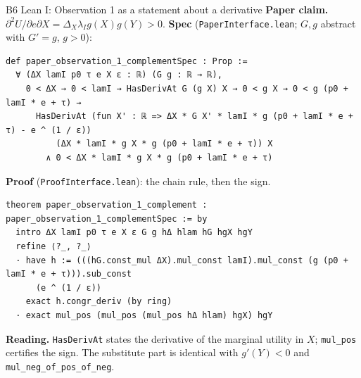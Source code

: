 \documentclass[aspectratio=169,11pt]{beamer}
\begin{document}
\begin{frame}[fragile]{B6 \textperiodcentered{} Lean I: Observation 1 as a statement about a derivative}
  \small\textbf{Paper claim.} $\partial^2U/\partial e\partial X=\Delta_X\lambda_I g(X)g(Y)>0$.
  \textbf{Spec} (\texttt{PaperInterface.lean}; $G,g$ abstract with $G'=g$, $g>0$):
\begin{lstlisting}
def paper_observation_1_complementSpec : Prop :=
  ∀ (ΔX lamI p0 τ e X ε : ℝ) (G g : ℝ → ℝ),
    0 < ΔX → 0 < lamI → HasDerivAt G (g X) X → 0 < g X → 0 < g (p0 + lamI * e + τ) →
      HasDerivAt (fun X' : ℝ => ΔX * G X' * lamI * g (p0 + lamI * e + τ) - e ^ (1 / ε))
          (ΔX * lamI * g X * g (p0 + lamI * e + τ)) X
        ∧ 0 < ΔX * lamI * g X * g (p0 + lamI * e + τ)
\end{lstlisting}
  \textbf{Proof} (\texttt{ProofInterface.lean}): the chain rule, then the sign.
\begin{lstlisting}
theorem paper_observation_1_complement : paper_observation_1_complementSpec := by
  intro ΔX lamI p0 τ e X ε G g hΔ hlam hG hgX hgY
  refine ⟨?_, ?_⟩
  · have h := (((hG.const_mul ΔX).mul_const lamI).mul_const (g (p0 + lamI * e + τ))).sub_const
      (e ^ (1 / ε))
    exact h.congr_deriv (by ring)
  · exact mul_pos (mul_pos (mul_pos hΔ hlam) hgX) hgY
\end{lstlisting}
  \textbf{Reading.} \texttt{HasDerivAt} states the derivative of the marginal utility in $X$; \texttt{mul\_pos} certifies
  the sign. The substitute part is identical with $g'(Y)<0$ and \texttt{mul\_neg\_of\_pos\_of\_neg}.
\end{frame}
\end{document}
